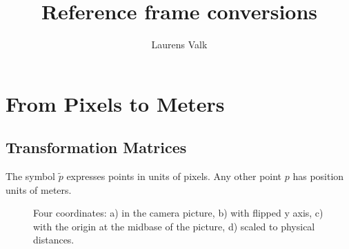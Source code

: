 \documentclass[12pt, a4paper]
{article}
\title{Reference frame conversions}
\author{Laurens Valk}
\providecommand{\tp}{\tilde{p}}
\begin{document}
\maketitle

\tableofcontents

\section{From Pixels to Meters} 
\subsection{Transformation Matrices}
The symbol $\tp$ expresses points in units of pixels. Any other point $p$ has position units of meters.
\begin{figure}[H]
\centering

\caption{Four coordinates: a) in the camera picture, b) with flipped y axis, c) with the origin at the midbase of the picture, d) scaled to physical distances.
\label{fig:robotframe}}
\end{figure}
\end{document}
